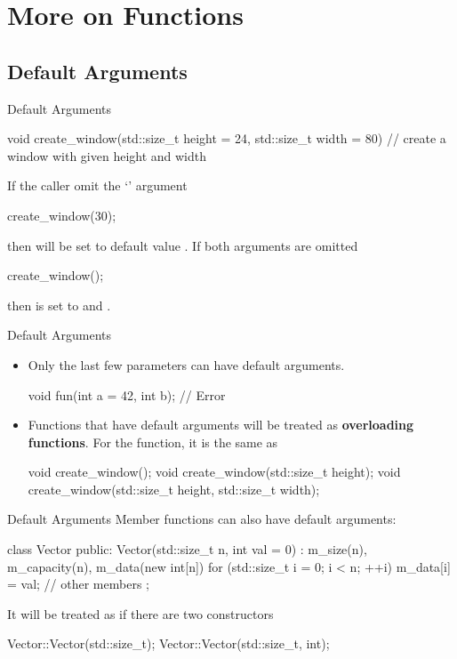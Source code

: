 \documentclass{beamer}
\begin{document}
\section{More on Functions}

\subsection{Default Arguments}

\begin{frame}[fragile]{Default Arguments}
    \begin{cpp}
void create_window(std::size_t height = 24,
                   std::size_t width = 80) {
  // create a window with given height and width
}
    \end{cpp}
    If the caller omit the `' argument
    \begin{cpp}
create_window(30);
    \end{cpp}
    then  will be set to default value .
    If both arguments are omitted
    \begin{cpp}
create_window();
    \end{cpp}
    then  is set to  and  .
\end{frame}

\begin{frame}[fragile]{Default Arguments}
    \begin{itemize}
        \item Only the last few parameters can have default arguments.
        \begin{cpp}
void fun(int a = 42, int b); // Error
        \end{cpp}
        \item Functions that have default arguments will be treated as \textbf{overloading functions}. For the  function, it is the same as
        \begin{cpp}
void create_window();
void create_window(std::size_t height);
void create_window(std::size_t height,
                   std::size_t width);
        \end{cpp}
    \end{itemize}
\end{frame}

\begin{frame}[fragile]{Default Arguments}
    Member functions can also have default arguments:
    \begin{cpp}
class Vector {
 public:
  Vector(std::size_t n, int val = 0)
      : m_size(n), m_capacity(n),
        m_data(new int[n]{}) {
    for (std::size_t i = 0; i < n; ++i)
      m_data[i] = val;
  }
  // other members
};
    \end{cpp}
    It will be treated as if there are two constructors
    \begin{cpp}
Vector::Vector(std::size_t);
Vector::Vector(std::size_t, int);
    \end{cpp}
\end{frame}
\end{document}
